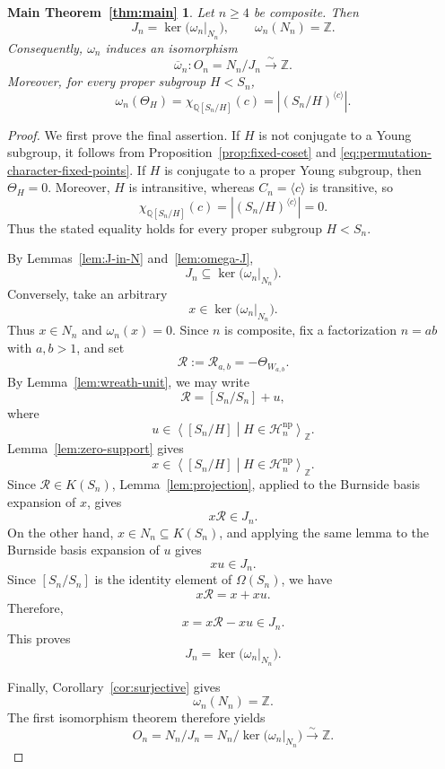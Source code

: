 \documentclass[a4paper,11pt]{article}
\numberwithin{equation}{section}
\newtheorem*{maintheoremrestated}{Main Theorem~\ref{thm:main}}
\newcommand{\Q}{\mathbb{Q}}
\newcommand{\Z}{\mathbb{Z}}
\begin{document}
\begin{maintheoremrestated}
Let $n\ge4$ be composite. Then
\[
  J_n=\ker\bigl(\omega_n|_{N_n}\bigr),
  \qquad
  \omega_n(N_n)=\Z.
\]
Consequently, $\omega_n$ induces an isomorphism
\[
  \overline\omega_n:
  O_n=N_n/J_n\xrightarrow{\sim}\Z.
\]
Moreover, for every proper subgroup $H<S_n$,
\[
  \omega_n(\Theta_H)
  =
  \chi_{\Q[S_n/H]}(c)
  =
  |(S_n/H)^{\langle c\rangle}|.
\]
\end{maintheoremrestated}

\begin{proof}
We first prove the final assertion. If $H$ is not conjugate to a Young subgroup,
it follows from Proposition~\ref{prop:fixed-coset} and
\eqref{eq:permutation-character-fixed-points}. If $H$ is conjugate to a proper
Young subgroup, then $\Theta_H=0$. Moreover, $H$ is intransitive, whereas
$C_n=\langle c\rangle$ is transitive, so
\[
  \chi_{\Q[S_n/H]}(c)
  =
  |(S_n/H)^{\langle c\rangle}|
  =0.
\]
Thus the stated equality holds for every proper subgroup $H<S_n$.

By Lemmas~\ref{lem:J-in-N} and~\ref{lem:omega-J},
\[
  J_n\subseteq\ker\bigl(\omega_n|_{N_n}\bigr).
\]
Conversely, take an arbitrary
\[
  x\in\ker\bigl(\omega_n|_{N_n}\bigr).
\]
Thus $x\in N_n$ and $\omega_n(x)=0$. Since $n$ is composite, fix a
factorization $n=ab$ with $a,b>1$, and set
\[
  \mathcal R:=\mathcal R_{a,b}=-\Theta_{W_{a,b}}.
\]
By Lemma~\ref{lem:wreath-unit}, we may write
\[
  \mathcal R=[S_n/S_n]+u,
\]
where
\[
  u\in
  \left\langle
    [S_n/H]
    \mathrel{}\middle|\mathrel{}
    H\in\mathcal H_n^{\mathrm{np}}
  \right\rangle_{\Z}.
\]
Lemma~\ref{lem:zero-support} gives
\[
  x\in
  \left\langle
    [S_n/H]
    \mathrel{}\middle|\mathrel{}
    H\in\mathcal H_n^{\mathrm{np}}
  \right\rangle_{\Z}.
\]
Since $\mathcal R\in K(S_n)$, Lemma~\ref{lem:projection}, applied to the
Burnside basis expansion of $x$, gives
\[
  x\mathcal R\in J_n.
\]
On the other hand, $x\in N_n\subseteq K(S_n)$, and applying the same lemma to
the Burnside basis expansion of $u$ gives
\[
  xu\in J_n.
\]
Since $[S_n/S_n]$ is the identity element of $\Omega(S_n)$, we have
\[
  x\mathcal R=x+xu.
\]
Therefore,
\[
  x=x\mathcal R-xu\in J_n.
\]
This proves
\[
  J_n=\ker\bigl(\omega_n|_{N_n}\bigr).
\]

Finally, Corollary~\ref{cor:surjective} gives
\[
  \omega_n(N_n)=\Z.
\]
The first isomorphism theorem therefore yields
\[
  O_n
  =N_n/J_n
  =N_n/\ker\bigl(\omega_n|_{N_n}\bigr)
  \xrightarrow{\sim}\Z.
\]
\end{proof}
\end{document}
